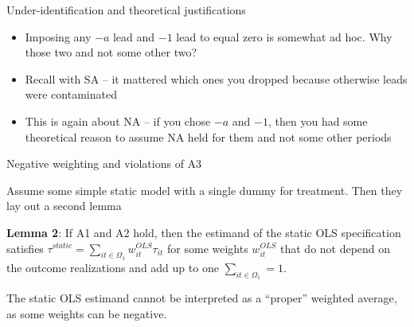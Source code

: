 \documentclass{beamer}
\begin{document}
\begin{frame}{Under-identification and theoretical justifications}

\begin{itemize}
\item Imposing any $-a$ lead and $-1$ lead to equal zero is somewhat ad hoc.  Why those two and not some other two?
\item Recall with SA -- it mattered which ones you dropped because otherwise leads were contaminated
\item This is again about NA -- if you chose $-a$ and $-1$, then you had some theoretical reason to assume NA held for them and not some other periods
\end{itemize}

\end{frame}



\begin{frame}{Negative weighting and violations of A3}

Assume some simple static model with a single dummy for treatment.  Then they lay out a second lemma

\bigskip 
\textbf{Lemma 2}: If A1 and A2 hold, then the estimand of the static OLS specification satisfies $\tau^{static}=\sum_{it \in \Omega_1} w_{it}^{OLS}\tau_{it}$ for some weights $w_{it}^{OLS}$ that do not depend on the outcome realizations and add up to one $\sum_{it \in \Omega_1}=1$.

\bigskip

The static OLS estimand cannot be interpreted as a ``proper'' weighted average, as some weights can be negative. 

\end{frame}
\end{document}
